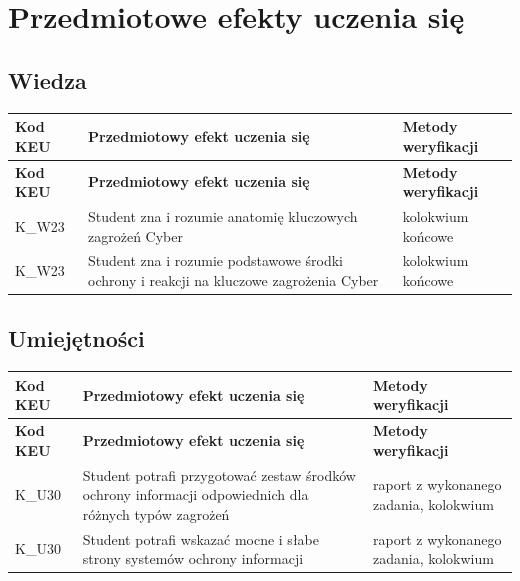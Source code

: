 \documentclass[12pt, a4paper]{article}
\newcommand{\thdrule}{\noalign{\global\setlength{\extrarowheight}{0pt}}}
\newcommand{\thdend}{\noalign{\global\setlength{\extrarowheight}{3pt}}}
\begin{document}
\section{Przedmiotowe efekty uczenia się}

\subsection*{Wiedza}
{\scriptsize
\begin{longtable}{m{1.6cm}m{9.0cm}m{4.2cm}}
\thdrule\toprule
\rowcolor{pjatkRed} {\color{white}\footnotesize\textbf{\vphantom{Ag}Kod KEU}} & {\color{white}\footnotesize\textbf{\vphantom{Ag}Przedmiotowy efekt uczenia się}} & {\color{white}\footnotesize\textbf{\vphantom{Ag}Metody weryfikacji}} \\
\midrule\thdend
\endfirsthead
\thdrule\toprule
\rowcolor{pjatkRed} {\color{white}\footnotesize\textbf{\vphantom{Ag}Kod KEU}} & {\color{white}\footnotesize\textbf{\vphantom{Ag}Przedmiotowy efekt uczenia się}} & {\color{white}\footnotesize\textbf{\vphantom{Ag}Metody weryfikacji}} \\
\midrule\thdend
\endhead
  \rowcolor{tableRowLight} K\_W23 & Student zna i rozumie anatomię kluczowych zagrożeń Cyber & kolokwium końcowe \\
  \rowcolor{tableRowAlt} K\_W23 & Student zna i rozumie podstawowe środki ochrony i reakcji na kluczowe zagrożenia Cyber & kolokwium końcowe \\
\bottomrule
\end{longtable}}

\subsection*{Umiejętności}
{\scriptsize
\begin{longtable}{m{1.6cm}m{9.0cm}m{4.2cm}}
\thdrule\toprule
\rowcolor{pjatkRed} {\color{white}\footnotesize\textbf{\vphantom{Ag}Kod KEU}} & {\color{white}\footnotesize\textbf{\vphantom{Ag}Przedmiotowy efekt uczenia się}} & {\color{white}\footnotesize\textbf{\vphantom{Ag}Metody weryfikacji}} \\
\midrule\thdend
\endfirsthead
\thdrule\toprule
\rowcolor{pjatkRed} {\color{white}\footnotesize\textbf{\vphantom{Ag}Kod KEU}} & {\color{white}\footnotesize\textbf{\vphantom{Ag}Przedmiotowy efekt uczenia się}} & {\color{white}\footnotesize\textbf{\vphantom{Ag}Metody weryfikacji}} \\
\midrule\thdend
\endhead
  \rowcolor{tableRowLight} K\_U30 & Student potrafi przygotować zestaw środków ochrony informacji odpowiednich dla różnych typów zagrożeń & raport z wykonanego zadania, kolokwium \\
  \rowcolor{tableRowAlt} K\_U30 & Student potrafi wskazać mocne i słabe strony systemów ochrony informacji & raport z wykonanego zadania, kolokwium \\
\bottomrule
\end{longtable}}
\end{document}
